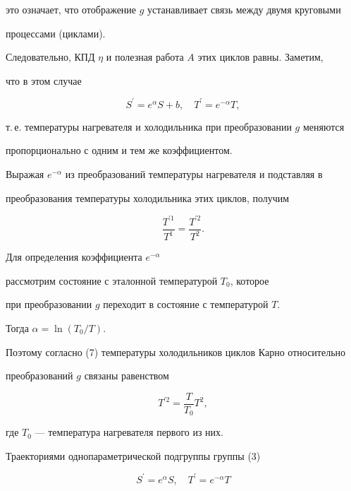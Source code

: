 это означает, что отображение $g$ устанавливает связь между двумя круговыми


процессами (циклами).


Следовательно, КПД $\eta$ и полезная работа $A$ этих циклов равны. Заметим,


что в этом случае


$$


S^{\prime}=e^{\alpha} S+b,\quad T^{\prime}=e^{-\alpha} T,


$$


т.\,е. температуры нагревателя и холодильника при преобразовании $g$ меняются


пропорционально с одним и тем же коэффициентом.


Выражая $e^{-\alpha}$ из преобразований температуры нагревателя и подставляя в


преобразования температуры холодильника этих циклов, получим


\begin{equation}


\frac{T^{\prime 1}}{T^1}=\frac{T^{\prime 2}}{T^2}.


\end{equation}


Для определения коэффициента $e^{-\alpha}$


рассмотрим состояние с эталонной температурой $T_0$, которое


при преобразовании $g$ переходит в состояние с температурой $T$.


Тогда $\alpha=\ln(T_0/T)$.


Поэтому согласно (7) температуры холодильников циклов Карно относительно


преобразований $g$ связаны равенством


$$


T^{\prime 2}=\frac{T}{T_0}T^2,


$$


где $T_0$ --- температура нагревателя первого из них.





Траекториями однопараметрической подгруппы группы (3)


\begin{equation}


S^{\prime}=e^{\alpha} S,\quad T^{\prime}=e^{-\alpha} T


\tag{$3'$}


\end{equation}


